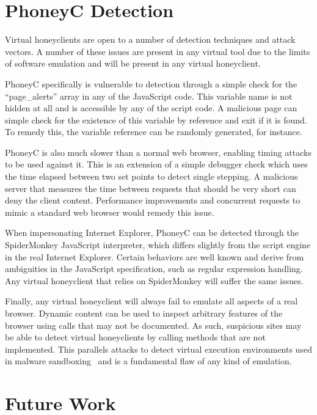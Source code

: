 \documentclass[10pt,twocolumn]{article}
\begin{document}
\section{PhoneyC Detection}
\label{weaknesses}

Virtual honeyclients are open to a number of detection techniques and attack vectors. A number of these issues are present in any virtual tool due to the limits of software emulation and will be present in any virtual honeyclient. 

PhoneyC specifically is vulnerable to detection through a simple check for the ``page\_alerts'' array in any of the JavaScript code. This variable name is not hidden at all and is accessible by any of the script code. A malicious page can simple check for the existence of this variable by reference and exit if it is found. To remedy this, the variable reference can be randomly generated, for instance.

PhoneyC is also much slower than a normal web browser, enabling timing attacks to be used against it. This is an extension of a simple debugger check which uses the time elapsed between two set points to detect single stepping. A malicious server that measures the time between requests that should be very short can deny the client content. Performance improvements and concurrent requests to mimic a standard web browser would remedy this issue.

When impersonating Internet Explorer, PhoneyC can be detected through the SpiderMonkey JavaScript interpreter, which differs slightly from the script engine in the real Internet Explorer. Certain behaviors are well known and derive from ambiguities in the JavaScript specification, such as regular expression handling. Any virtual honeyclient that relies on SpiderMonkey will suffer the same issues. 

Finally, any virtual honeyclient will always fail to emulate all aspects of a real browser. Dynamic content can be used to inspect arbitrary features of the browser using calls that may not be documented. As such, suspicious sites may be able to detect virtual honeyclients by calling methods that are not implemented. This parallels attacks to detect virtual execution environments used in malware sandboxing~\cite{natvig:2008} and is a fundamental flaw of any kind of emulation.

\section{Future Work}
\label{future-work}
\end{document}
